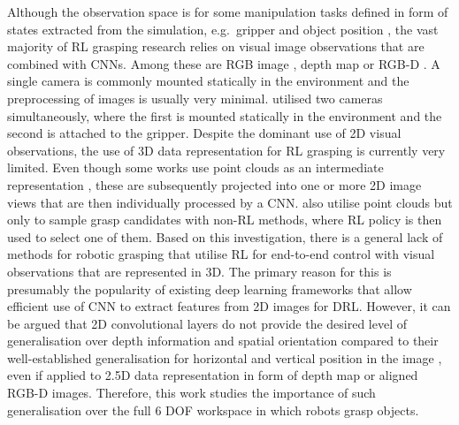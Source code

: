 Although the observation space is for some manipulation tasks defined in form of states extracted from the simulation, e.g.~gripper and object position \cite{popov_data-efficient_2017, haarnoja_composable_2018}, the vast majority of RL grasping research relies on visual image observations that are combined with CNNs. Among these are RGB image \cite{tobin_domain_2017, kalashnikov_qt-opt_2018, quillen_deep_2018, kim_acceleration_2020, iqbal_toward_2020}, depth map \cite{gualtieri_learning_2018, breyer_comparing_2019, wu_generative_2020} or RGB-D \cite{zeng_learning_2018, liu_active_2019, daniel_deep_2020}. A single camera is commonly mounted statically in the environment and the preprocessing of images is usually very minimal. \citet{zhan_framework_2020, joshi_robotic_2020} utilised two cameras simultaneously, where the first is mounted statically in the environment and the second is attached to the gripper. Despite the dominant use of 2D visual observations, the use of 3D data representation for RL grasping is currently very limited. Even though some works use point clouds as an intermediate representation \cite{zeng_learning_2018, gualtieri_learning_2018}, these are subsequently projected into one or more 2D image views that are then individually processed by a CNN. \citet{osa_experiments_2017, gualtieri_pick_2018} also utilise point clouds but only to sample grasp candidates with non-RL methods, where RL policy is then used to select one of them. Based on this investigation, there is a general lack of methods for robotic grasping that utilise RL for end-to-end control with visual observations that are represented in 3D. The primary reason for this is presumably the popularity of existing deep learning frameworks that allow efficient use of CNN to extract features from 2D images for DRL. However, it can be argued that 2D convolutional layers do not provide the desired level of generalisation over depth information and spatial orientation compared to their well-established generalisation for horizontal and vertical position in the image \cite{gualtieri_pick_2018}, even if applied to 2.5D data representation in form of depth map or aligned RGB-D images. Therefore, this work studies the importance of such generalisation over the full 6 DOF workspace in which robots grasp objects.

